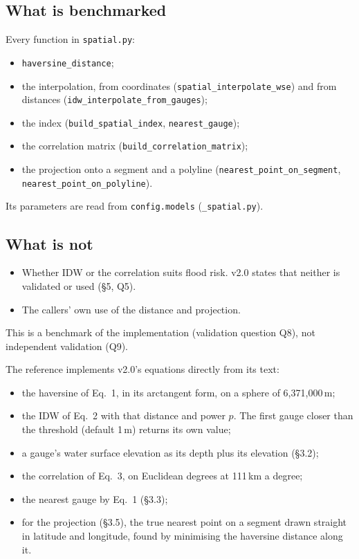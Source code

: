 \documentclass[11pt,a4paper]{article}
\begin{document}
\subsection{What is benchmarked}
Every function in \texttt{spatial.py}:
\begin{itemize}[leftmargin=*,nosep]
\item \texttt{haversine\_distance};
\item the interpolation, from coordinates (\texttt{spatial\_interpolate\_wse}) and from
  distances (\texttt{idw\_interpolate\_from\_gauges});
\item the index (\texttt{build\_spatial\_index}, \texttt{nearest\_gauge});
\item the correlation matrix (\texttt{build\_correlation\_matrix});
\item the projection onto a segment and a polyline (\texttt{nearest\_point\_on\_segment},
  \texttt{nearest\_point\_on\_polyline}).
\end{itemize}
Its parameters are read from \texttt{config.models} (\texttt{\_spatial.py}).

\subsection{What is not}
\begin{itemize}[leftmargin=*,nosep]
\item Whether IDW or the correlation suits flood risk. v2.0 states that neither is
  validated or used (\S5, Q5).
\item The callers' own use of the distance and projection.
\end{itemize}
This is a benchmark of the implementation (validation question Q8), not independent
validation (Q9).

\mkmframework

The reference implements v2.0's equations directly from its text:
\begin{itemize}[leftmargin=*,nosep]
\item the haversine of Eq.~1, in its arctangent form, on a sphere of 6{,}371{,}000\,m;
\item the IDW of Eq.~2 with that distance and power $p$. The first gauge closer than the
  threshold (default 1\,m) returns its own value;
\item a gauge's water surface elevation as its depth plus its elevation (\S3.2);
\item the correlation of Eq.~3, on Euclidean degrees at 111\,km a degree;
\item the nearest gauge by Eq.~1 (\S3.3);
\item for the projection (\S3.5), the true nearest point on a segment drawn straight in
  latitude and longitude, found by minimising the haversine distance along it.
\end{itemize}
\end{document}
